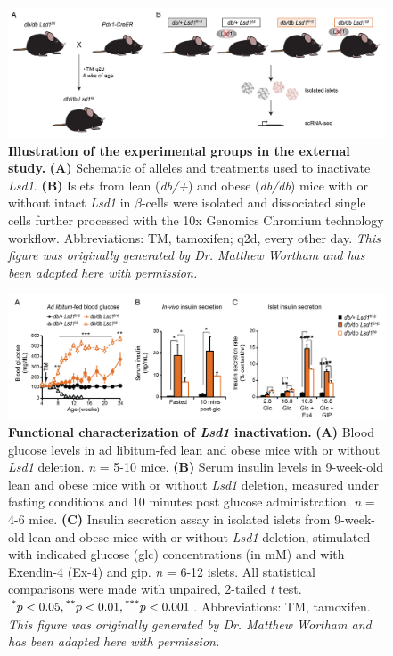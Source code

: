 \begin{figure}[t]
    \centering
    \includegraphics[width=\linewidth]{Chapter5/Fig/F3-17-02.png}
    \caption[Illustration of the experimental groups in the external study]{\textbf{Illustration of the experimental groups in the external study.} \textbf{(A)} Schematic of alleles and treatments used to inactivate \textit{Lsd1}. \textbf{(B)} Islets from lean (\textit{db/+}) and obese (\textit{db/db}) mice with or without intact \textit{Lsd1} in $\beta$-cells were isolated and dissociated single cells further processed with the 10x Genomics Chromium technology workflow. Abbreviations: TM, tamoxifen; q2d, every other day. \textit{This figure was originally generated by Dr. Matthew Wortham and has been adapted here with permission.}}
    \label{fig:chp3_valid_study_design}
\end{figure}

\begin{figure}[H]
    \centering
    \includegraphics[width=\linewidth]{Chapter5/Fig/F3-20-01.png}
    \caption[Functional characterization of \textit{Lsd1} inactivation]{\textbf{Functional characterization of \textit{Lsd1} inactivation.} \textbf{(A)} Blood glucose levels in ad libitum-fed lean and obese mice with or without \textit{Lsd1} deletion. \textit{n} = 5-10 mice. \textbf{(B)} Serum insulin levels in 9-week-old lean and obese mice with or without \textit{Lsd1} deletion, measured under fasting conditions and 10 minutes post glucose administration. \textit{n} = 4-6 mice. \textbf{(C)} Insulin secretion assay in isolated islets from 9-week-old lean and obese mice with or without \textit{Lsd1} deletion, stimulated with indicated glucose (glc) concentrations (in mM) and with Exendin-4 (Ex-4) and \acrfull{gip}. \textit{n} = 6-12 islets. All statistical comparisons were made with unpaired, 2-tailed \textit{t} test. $\textsuperscript{*} p < 0.05, \textsuperscript{**} p < 0.01, \textsuperscript{***} p < 0.001$. Abbreviations: TM, tamoxifen. \textit{This figure was originally generated by Dr. Matthew Wortham and has been adapted here with permission.}}
    \label{fig:chp3_valid_study_metab}
\end{figure}

